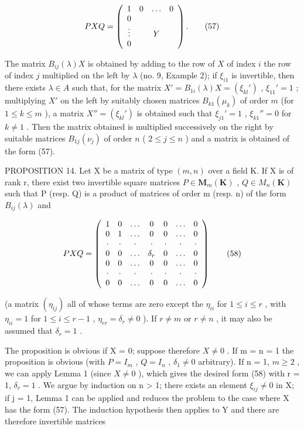 \[
P X Q = \left( \begin{array}{c c c c} 1 & 0 & \ldots & 0 \\ 0 & & \\ \vdots & & Y \\ 0 & & \end{array} \right).\tag{57}
\]

The matrix \(B_{ij}(\lambda)X\) is obtained by adding to the row of \(X\) of index \(i\) the row of index \(j\) multiplied on the left by \(\lambda\) (no. 9, Example 2); if \(\xi_{i1}\) is invertible, then there exists \(\lambda \in A\) such that, for the matrix \(X' = B_{1i}(\lambda)X = (\xi_{kl}')\) , \(\xi_{11}' = 1\) ; multiplying \(X'\) on the left by suitably chosen matrices \(B_{k1}(\mu_k)\) of order \(m\) (for \(1 \leqslant k \leqslant m\) ), a matrix \(X'' = (\xi_{kl}')\) is obtained such that \(\xi_{j1}' = 1\) , \(\xi_{k1}'' = 0\) for \(k \neq 1\) . Then the matrix obtained is multiplied successively on the right by suitable matrices \(B_{1j}(\nu_j)\) of order \(n\) ( \(2 \leqslant j \leqslant n\) ) and a matrix is obtained of the form (57).

PROPOSITION 14. Let X be a matrix of type \((m, n)\) over a field K. If X is of rank r, there exist two invertible square matrices \(P \in \mathbf{M}_{m}(\mathbf{K})\) , \(Q \in M_{n}(\mathbf{K})\) such that P (resp. Q) is a product of matrices of order m (resp. n) of the form \(B_{ij}(\lambda)\) and

\[
P X Q = \left( \begin{array}{c c c c c c c} 1 & 0 & \dots & 0 & 0 & \dots & 0 \\ 0 & 1 & \dots & 0 & 0 & \dots & 0 \\ \cdot & \cdot & \cdot & \cdot & \cdot & \cdot & \cdot \\ 0 & 0 & \dots & \delta_ {r} & 0 & \dots & 0 \\ 0 & 0 & \dots & 0 & 0 & \dots & 0 \\ \cdot & \cdot & \cdot & \cdot & \cdot & \cdot & \cdot \\ 0 & 0 & \dots & 0 & 0 & \dots & 0 \end{array} \right)\tag{58}
\]

(a matrix \((\eta_{ij})\) all of whose terms are zero except the \(\eta_{ii}\) for \(1 \leqslant i \leqslant r\) , with \(\eta_{ii} = 1\) for \(1 \leqslant i \leqslant r - 1\) , \(\eta_{rr} = \delta_r \neq 0\) ). If \(r \neq m\) or \(r \neq n\) , it may also be assumed that \(\delta_r = 1\) .

The proposition is obvious if X = 0; suppose therefore \(X \neq 0\) . If m = n = 1 the proposition is obvious (with \(P = I_{m}\) , \(Q = I_{n}\) , \(\delta_{1} \neq 0\) arbitrary). If n = 1, \(m \geqslant 2\) , we can apply Lemma 1 (since \(X \neq 0\) ), which gives the desired form (58) with r = 1, \(\delta_{r} = 1\) . We argue by induction on n \textgreater{} 1; there exists an element \(\xi_{ij} \neq 0\) in X; if j = 1, Lemma 1 can be applied and reduces the problem to the case where X has the form (57). The induction hypothesis then applies to Y and there are therefore invertible matrices

